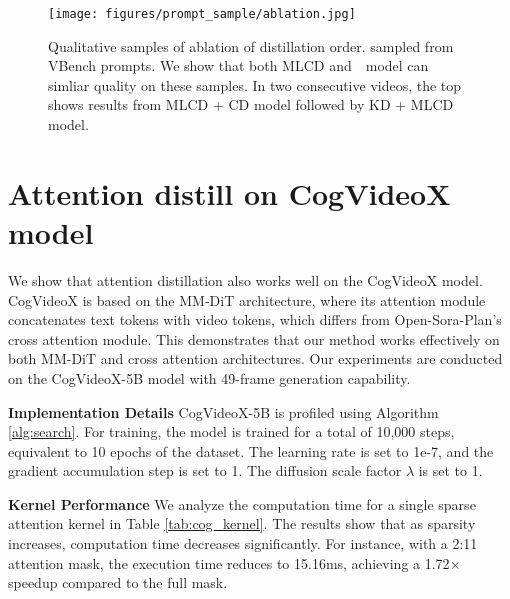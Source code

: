 \begin{figure}[t]
  \centering
  \texttt{[image: figures/prompt\_sample/ablation.jpg]}
  \caption{Qualitative samples of ablation of distillation order. sampled from VBench prompts. We show that both MLCD  and~\methodname~model can simliar quality on these samples. In two consecutive videos, the top shows results from MLCD + CD model followed by KD + MLCD model.}
  \label{fig:vbench_abl}
\end{figure}

\clearpage

\section{Attention distill on CogVideoX model}
\label{appendix:cogvideo}

We show that attention distillation also works well on the CogVideoX \cite{yang2024cogvideox} model. CogVideoX is based on the MM-DiT architecture, where its attention module concatenates text tokens with video tokens, which differs from Open-Sora-Plan's cross attention module. This demonstrates that our method works effectively on both MM-DiT and cross attention architectures. Our experiments are conducted on the CogVideoX-5B model with 49-frame generation capability.

\textbf{Implementation Details} CogVideoX-5B is profiled using Algorithm \ref{alg:search}. For training, the model is trained for a total of 10,000 steps, equivalent to 10 epochs of the dataset. The learning rate is set to 1e-7, and the gradient accumulation step is set to 1. The diffusion scale factor $\lambda$ is set to 1.

\textbf{Kernel Performance} We analyze the computation time for a single sparse attention kernel in Table \ref{tab:cog_kernel}. The results show that as sparsity increases, computation time decreases significantly. For instance, with a 2:11 attention mask, the execution time reduces to 15.16ms, achieving a 1.72$\times$ speedup compared to the full mask.

